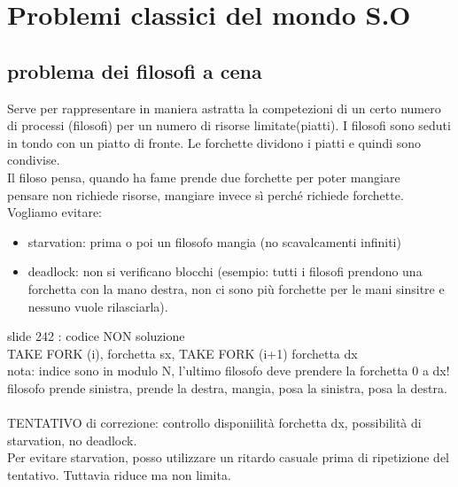 \documentclass{article}
\begin{document}
\section{Problemi classici del mondo S.O}
\subsection{problema dei filosofi a cena}
Serve per rappresentare in maniera astratta la competezioni di un certo numero di processi (filosofi) per un numero di risorse limitate(piatti). I filosofi sono seduti in tondo con un piatto di fronte. Le forchette dividono i piatti e quindi sono condivise.\\
Il filoso pensa, quando ha fame prende due forchette per poter mangiare\\
pensare non richiede risorse, mangiare invece sì perché richiede forchette.\\
Vogliamo evitare:
\begin{itemize}
    \item starvation: prima o poi un filosofo mangia (no scavalcamenti infiniti)
    \item deadlock: non si verificano blocchi (esempio: tutti i filosofi prendono una forchetta con la mano destra, non ci sono più forchette per le mani sinsitre e nessuno vuole rilasciarla).
\end{itemize}
slide 242 : codice NON soluzione\\
TAKE FORK (i), forchetta sx, TAKE FORK (i+1) forchetta dx\\
nota: indice sono in modulo N, l'ultimo filosofo deve prendere la forchetta 0 a dx!\\
filosofo prende sinistra, prende la destra, mangia, posa la sinistra, posa la destra.\\
\\
TENTATIVO di correzione: controllo disponiilità forchetta dx,
possibilità di starvation, no deadlock. \\

Per evitare starvation, posso utilizzare un ritardo casuale prima di ripetizione
 del tentativo. Tuttavia riduce ma non limita.
\end{document}
